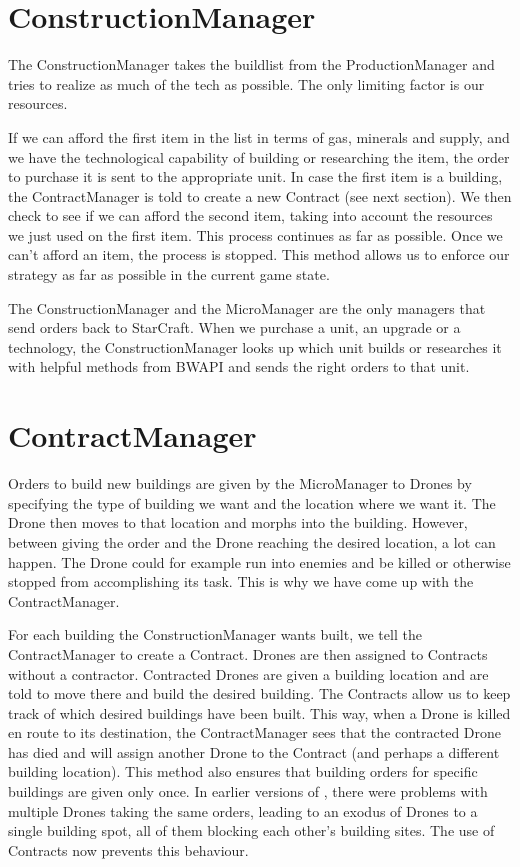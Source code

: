 \section{ConstructionManager}

The ConstructionManager takes the buildlist from the ProductionManager and tries to realize as much of the tech as possible. The only limiting factor is our resources.

If we can afford the first item in the list in terms of gas, minerals and supply, and we have the technological capability of building or researching the item, the order to purchase it is sent to the appropriate unit. In case the first item is a building, the ContractManager is told to create a new Contract (see next section). We then check to see if we can afford the second item, taking into account the resources we just used on the first item. This process continues as far as possible. Once we can't afford an item, the process is stopped. This method allows us to enforce our strategy as far as possible in the current game state.

The ConstructionManager and the MicroManager are the only managers that send orders back to StarCraft. When we purchase a unit, an upgrade or a technology, the ConstructionManager looks up which unit builds or researches it with helpful methods from BWAPI and sends the right orders to that unit.

\section{ContractManager}

Orders to  build new buildings are given by the MicroManager to Drones by specifying the type of building we want and the location where we want it. The Drone then moves to that location and morphs into the building. However, between giving the order and the Drone reaching the desired location, a lot can happen. The Drone could for example run into enemies and be killed or otherwise stopped from accomplishing its task. This is why we have come up with the ContractManager.

For each building the ConstructionManager wants built, we tell the ContractManager to create a Contract. Drones are then assigned to Contracts without a contractor. Contracted Drones are given a building location and are told to move there and build the desired building. The Contracts allow us to keep track of which desired buildings have been built. This way, when a Drone is killed en route to its destination, the ContractManager sees that the contracted Drone has died and will assign another Drone to the Contract (and perhaps a different building location). This method also ensures that building orders for specific buildings are given only once. In earlier versions of \massexpand{}, there were problems with multiple Drones taking the same orders, leading to an exodus of Drones to a single building spot, all of them blocking each other's building sites. The use of Contracts now prevents this behaviour.

